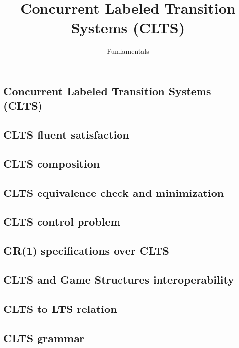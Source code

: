 \documentclass{article}
\title{Concurrent Labeled Transition Systems (CLTS)} %
\author{Fundamentals} %
\date{}
\begin{document}
\maketitle

\setcounter{section}{1} %
\setcounter{theorem}{1} %

\subsection{Concurrent Labeled Transition Systems (CLTS)}


\subsection{CLTS fluent satisfaction}


\subsection{CLTS composition}


\newpage
\subsection{CLTS equivalence check and minimization}


\newpage
\subsection{CLTS control problem}


\newpage
\subsection{GR(1) specifications over CLTS}


\newpage
\subsection{CLTS and Game Structures interoperability}


\newpage
\subsection{CLTS to LTS relation}



\subsection{CLTS grammar}

\newpage


\end{document}
